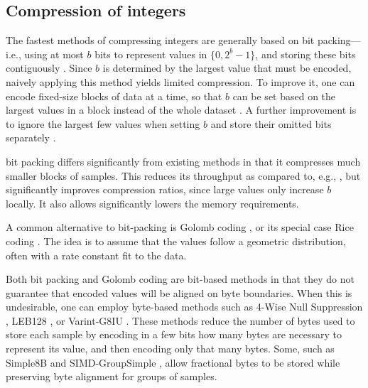 

\subsection{Compression of integers}


The fastest methods of compressing integers are generally based on bit packing---i.e., using at most $b$ bits to represent values in $\{0, 2^b-1\}$, and storing these bits contiguously \cite{bbp, pfor, fastpfor}. Since $b$ is determined by the largest value that must be encoded, naively applying this method yields limited compression. To improve it, one can encode fixed-size blocks of data at a time, so that $b$ can be set based on the largest values in a block instead of the whole dataset \cite{kGamma, pfor, fastpfor}. A further improvement is to ignore the largest few values when setting $b$ and store their omitted bits separately \cite{pfor, fastpfor}.

\minesp bit packing differs significantly from existing methods in that it compresses much smaller blocks of samples. This reduces its throughput as compared to, e.g., \cite{fastpfor}, but significantly improves compression ratios, since large values only increase $b$ locally. It also allows significantly lowers the memory requirements.

A common \cite{flac, shorten} alternative to bit-packing is Golomb coding \cite{golomb}, or its special case Rice coding \cite{rice}. The idea is to assume that the values follow a geometric distribution, often with a rate constant fit to the data. %

Both bit packing and Golomb coding are bit-based methods in that they do not guarantee that encoded values will be aligned on byte boundaries. When this is undesirable, one can employ byte-based methods such as 4-Wise Null Suppression \cite{kGamma}, LEB128 \cite{dwarf}, or Varint-G8IU \cite{varintG8IU}. These methods reduce the number of bytes used to store each sample by encoding in a few bits how many bytes are necessary to represent its value, and then encoding only that many bytes. Some, such as Simple8B \cite{simple8b} and SIMD-GroupSimple \cite{groupSimd}, allow fractional bytes to be stored while preserving byte alignment for groups of samples. %

